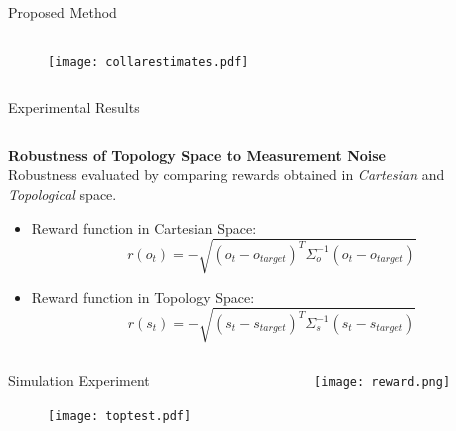 \documentclass[final,hyperref={pdfpagelabels=false}]{beamer}
\begin{document}
\begin{frame}[t]
\begin{columns}[t]
\begin{column}{0.96\linewidth}
\begin{alertblock}{Proposed Method}
\begin{columns}[t]
\begin{column}{0.24\linewidth}
\vspace{3mm}

\begin{figure}
\centering
\texttt{[image: collarestimates.pdf]}
\end{figure}

\end{column}

\end{columns}

\end{alertblock}

\begin{alertblock}{Experimental Results}

\begin{columns}[t]

\begin{column}{0.49\linewidth}

\centering \textbf{Robustness of Topology Space to Measurement Noise}\\
\vspace{3mm}
\centering Robustness evaluated by comparing rewards obtained in \emph{Cartesian} and \emph{Topological} space.

\begin{itemize}
\item Reward function in Cartesian Space:
\begin{equation}
r(o_t) = - \sqrt{(o_t - o_{target})^T \Sigma_o^{-1} (o_t - o_{target})}
\end{equation}
\item Reward function in Topology Space:
\begin{equation}
r(s_t) = - \sqrt{(s_t - s_{target})^T \Sigma_s^{-1} (s_t - s_{target})}
\end{equation}
\end{itemize}

\begin{columns}[t]

\begin{column}{0.49\linewidth}

\centering Simulation Experiment
\begin{figure}
\centering
\texttt{[image: toptest.pdf]}
\end{figure}

\end{column}

\begin{column}{0.49\linewidth}

\begin{figure}
\centering
\texttt{[image: reward.png]}
\end{figure}


\end{column}
\end{columns}
\end{column}
\end{columns}
\end{alertblock}
\end{column}
\end{columns}
\end{frame}
\end{document}
